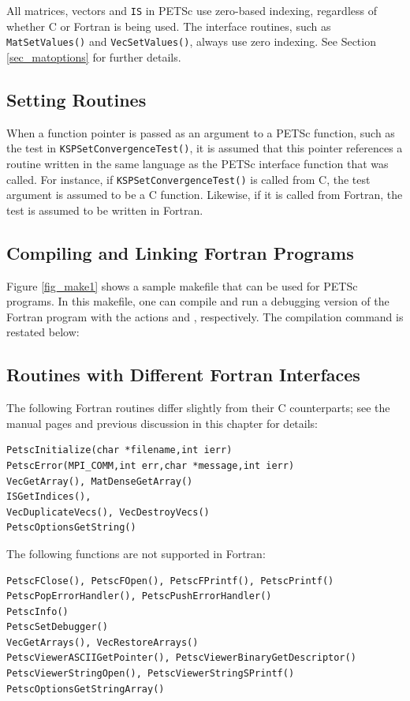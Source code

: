 All matrices, vectors and \lstinline{IS} in PETSc use zero-based indexing, regardless
of whether C or Fortran is being used.  The interface routines, such
as \lstinline{MatSetValues()} and \lstinline{VecSetValues()}, always use zero
indexing.  See Section \ref{sec_matoptions} for further details.

\subsection{Setting Routines}

When a function pointer is passed as an argument to a PETSc function, such as
the test in \lstinline{KSPSetConvergenceTest()}, it is assumed that this pointer references
a routine written in the same language as the PETSc interface function that was
called. For instance, if \lstinline{KSPSetConvergenceTest()} is called from C, the test
argument is assumed to be a C function. Likewise, if it is called from Fortran,
the test is assumed to be written in Fortran.

\subsection{Compiling and Linking Fortran Programs}
\label{sec_fortcompile}

Figure \ref{fig_make1} shows a sample makefile that can be used for
PETSc programs.  In this makefile, one can compile and run a debugging version
of the Fortran program  with the actions    and
 , respectively. The compilation command is restated below:
\begin{makelisting}
ex3: ex3.o 
       -${FLINKER}} -o ex3 ex3.o ${PETSC_LIB}
        ${RM} ex3.o
\end{makelisting}

\subsection{Routines with Different Fortran Interfaces}
\label{sec_fortran_exceptions}

The following Fortran routines differ slightly from their C counterparts; see the
manual pages and previous discussion in this chapter for details:
\begin{lstlisting}
PetscInitialize(char *filename,int ierr)
PetscError(MPI_COMM,int err,char *message,int ierr)
VecGetArray(), MatDenseGetArray()
ISGetIndices(), 
VecDuplicateVecs(), VecDestroyVecs()
PetscOptionsGetString()
\end{lstlisting}
The following functions are not supported in Fortran:
\begin{lstlisting}
PetscFClose(), PetscFOpen(), PetscFPrintf(), PetscPrintf()
PetscPopErrorHandler(), PetscPushErrorHandler()
PetscInfo()
PetscSetDebugger()
VecGetArrays(), VecRestoreArrays()
PetscViewerASCIIGetPointer(), PetscViewerBinaryGetDescriptor()
PetscViewerStringOpen(), PetscViewerStringSPrintf()
PetscOptionsGetStringArray()
\end{lstlisting}

